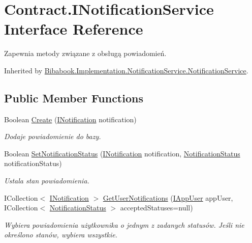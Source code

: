 \hypertarget{interface_contract_1_1_i_notification_service}{}\section{Contract.\+I\+Notification\+Service Interface Reference}
\label{interface_contract_1_1_i_notification_service}


Zapewnia metody związane z obsługą powiadomień.  




Inherited by \hyperlink{class_bibabook_1_1_implementation_1_1_notification_service_1_1_notification_service}{Bibabook.\+Implementation.\+Notification\+Service.\+Notification\+Service}.

\subsection*{Public Member Functions}
\begin{DoxyCompactItemize}
\item 
Boolean \hyperlink{interface_contract_1_1_i_notification_service_acfc2b40ce5ee992f1525f85938780209}{Create} (\hyperlink{interface_contract_1_1_i_notification}{I\+Notification} notification)
\begin{DoxyCompactList}\small\item\em Dodaje powiadomienie do bazy. \end{DoxyCompactList}\item 
Boolean \hyperlink{interface_contract_1_1_i_notification_service_aea44f9b679e27dc6e5b6deb0bed06d89}{Set\+Notification\+Status} (\hyperlink{interface_contract_1_1_i_notification}{I\+Notification} notification, \hyperlink{namespace_contract_a825ee6cf36a3a102b109de3a1cbd9c26}{Notification\+Status} notification\+Status)
\begin{DoxyCompactList}\small\item\em Ustala stan powiadomienia. \end{DoxyCompactList}\item 
I\+Collection$<$ \hyperlink{interface_contract_1_1_i_notification}{I\+Notification} $>$ \hyperlink{interface_contract_1_1_i_notification_service_a8686197b365f477af9a0c8f931017360}{Get\+User\+Notifications} (\hyperlink{interface_contract_1_1_i_app_user}{I\+App\+User} app\+User, I\+Collection$<$ \hyperlink{namespace_contract_a825ee6cf36a3a102b109de3a1cbd9c26}{Notification\+Status} $>$ accepted\+Statuses=null)
\begin{DoxyCompactList}\small\item\em Wybiera powiadomienia użytkownika o jednym z zadanych statusów. Jeśli nie określono stanów, wybiera wszystkie. \end{DoxyCompactList}\end{DoxyCompactItemize}


